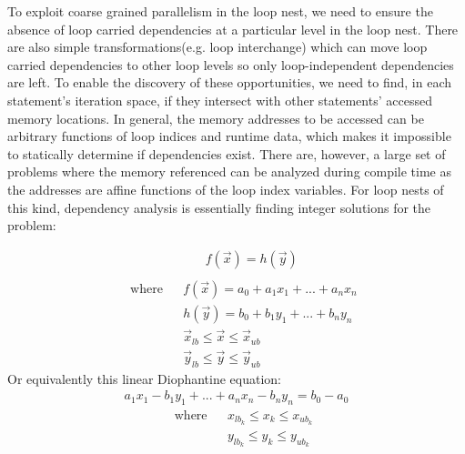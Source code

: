 To exploit coarse grained parallelism in the loop nest, we need to ensure the
absence of loop carried dependencies at a particular level in the loop nest. There are also simple transformations(e.g. loop interchange) which can move loop carried
dependencies to other loop levels so only loop-independent dependencies are left. To enable the discovery of these opportunities, we need to find, in each statement's iteration space, if they intersect with other statements' accessed memory locations. In general, the memory addresses to be accessed can be arbitrary functions of loop indices and runtime data, which makes it impossible to statically determine if
dependencies exist. There are, however, a large set of problems where
the memory referenced can be analyzed during compile time as the addresses are affine functions of the loop index variables. For loop nests of this kind,
dependency analysis is essentially finding integer solutions for the problem:

\begin{equation}
\begin{aligned}
\label{dioeq}
& \text{} & & f(\vec{x}) = h(\vec{y}) \\
\end{aligned}
\end{equation}
\begin{equation*}
\begin{aligned}
& \text{ where}  & & f(\vec{x}) = a_0 + a_1x_1+...+a_nx_n \\
& & & h(\vec{y}) = b_0 + b_1y_1+...+b_ny_n \\
& & & \vec{x}_{lb} \le \vec{x} \le \vec{x}_{ub} \\
& & & \vec{y}_{lb} \le \vec{y} \le \vec{y}_{ub}
\end{aligned}
\end{equation*}
Or equivalently this linear Diophantine equation:
\begin{equation}
\begin{aligned}
\label{adioeq}
a_1x_1-b_1y_1+...+a_nx_n-b_ny_n = b_0 - a_0
\end{aligned}
\end{equation}
\begin{equation*}
\begin{aligned}
& \text{ where}  & & x_{lb}_k \le x_k \le x_{ub}_k \\
& & & y_{lb}_k \le y_k \le y_{ub}_k \\
\end{aligned}
\end{equation*}

